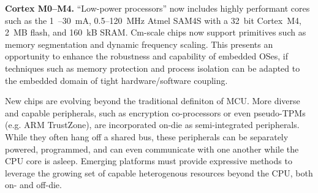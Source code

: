\smallskip\noindent
\textbf{Cortex M0--M4.}
``Low-power processors'' now includes highly performant cores such as the
1~\uA--30~mA, 0.5--120~MHz Atmel SAM4S with a 32~bit Cortex~M4, 2~MB flash,
and 160~kB SRAM.
%
Cm-scale chips now support primitives such as memory segmentation and
dynamic frequency scaling. This presents an opportunity to enhance the
robustness and capability of embedded OSes, if techniques such as memory
protection and process isolation can be adapted to the embedded domain of
tight hardware/software coupling.
%

New chips are evolving beyond the traditional definiton of MCU.  More diverse
and capable peripherals, such as encryption co-processors or even pseudo-TPMs
(e.g. ARM TrustZone), are incorporated on-die as semi-integrated peripherals.
While they often hang off a shared bus, these peripherals can be separately
powered, programmed, and can even communicate with one another while the CPU
core is asleep. Emerging platforms must provide expressive methods to leverage
the growing set of capable heterogenous resources beyond the CPU, both on- and
off-die.




%

